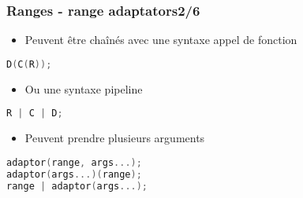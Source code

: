 \documentclass[C++.tex]{subfiles}
\begin{document}
\begin{frame}[fragile]
	\frametitle{Ranges - range adaptators\titlehfill{}2/6}
	\begin{itemize}
		\item Peuvent être chaînés avec une syntaxe \og appel de fonction\fg{}
	\end{itemize}

	\begin{lstlisting}[language=C++]
D(C(R));\end{lstlisting}
		
	\begin{itemize}
		\item Ou une syntaxe \og pipeline\fg{}
	\end{itemize}

	\begin{lstlisting}[language=C++]
R | C | D;\end{lstlisting}

	\begin{itemize}
		\item Peuvent prendre plusieurs arguments

	\end{itemize}

	\begin{lstlisting}[language=C++]
adaptor(range, args...);
adaptor(args...)(range);
range | adaptor(args...);\end{lstlisting}

\end{frame}
\end{document}

